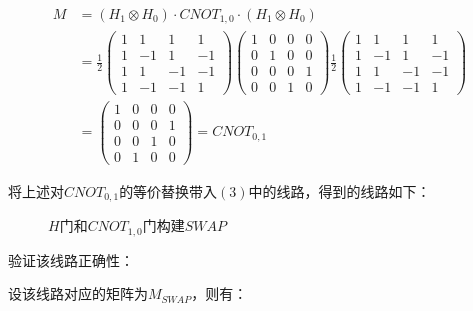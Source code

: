 \documentclass[12pt]{article}
\begin{document}
\begin{align*}
    M &= (H_1 \otimes H_0) \cdot CNOT_{1,0} \cdot (H_1 \otimes H_0) \\
    &= \frac{1}{2}\begin{pmatrix}1 & 1 & 1 & 1 \\ 1 & -1 & 1 & -1 \\ 1 & 1 & -1 & -1 \\ 1 & -1 & -1 & 1\end{pmatrix}
    \begin{pmatrix}1 & 0 & 0 & 0 \\ 0 & 1 & 0 & 0 \\ 0 & 0 & 0 & 1 \\ 0 & 0 & 1 & 0\end{pmatrix}
    \frac{1}{2}\begin{pmatrix}1 & 1 & 1 & 1 \\ 1 & -1 & 1 & -1 \\ 1 & 1 & -1 & -1 \\ 1 & -1 & -1 & 1\end{pmatrix} \\
    &= \begin{pmatrix} 1 & 0 & 0 & 0 \\ 0 & 0 & 0 & 1 \\ 0 & 0 & 1 & 0 \\ 0 & 1 & 0 & 0\end{pmatrix} = CNOT_{0,1}
\end{align*}

将上述对$CNOT_{0,1}$的等价替换带入$(3)$中的线路，得到的线路如下：

\begin{figure}[h]
    \centering
    \caption{$H$门和$CNOT_{1,0}$门构建$SWAP$}
    \label{circuit:swap}
\end{figure}

验证该线路正确性：

设该线路对应的矩阵为$M_{SWAP}$，则有：
\end{document}
